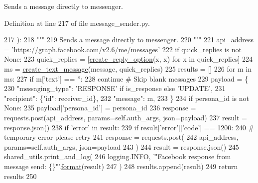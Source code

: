 \begin{DoxyVerb}Sends a message directly to messenger.
\end{DoxyVerb}
 

Definition at line 217 of file message\+\_\+sender.\+py.


\begin{DoxyCode}
217     ):
218         \textcolor{stringliteral}{"""}
219 \textcolor{stringliteral}{        Sends a message directly to messenger.}
220 \textcolor{stringliteral}{        """}
221         api\_address = \textcolor{stringliteral}{'https://graph.facebook.com/v2.6/me/messages'}
222         \textcolor{keywordflow}{if} quick\_replies \textcolor{keywordflow}{is} \textcolor{keywordflow}{not} \textcolor{keywordtype}{None}:
223             quick\_replies = [\hyperlink{namespaceparlai_1_1chat__service_1_1services_1_1messenger_1_1message__sender_a895e006007913ad0fde9c2c9bf9ec5a5}{create\_reply\_option}(x, x) \textcolor{keywordflow}{for} x \textcolor{keywordflow}{in} quick\_replies]
224         ms = \hyperlink{namespaceparlai_1_1chat__service_1_1services_1_1messenger_1_1message__sender_a4c32dfd7947a473a730b81e9356e3513}{create\_text\_message}(message, quick\_replies)
225         results = []
226         \textcolor{keywordflow}{for} m \textcolor{keywordflow}{in} ms:
227             \textcolor{keywordflow}{if} m[\textcolor{stringliteral}{'text'}] == \textcolor{stringliteral}{''}:
228                 \textcolor{keywordflow}{continue}  \textcolor{comment}{# Skip blank messages}
229             payload = \{
230                 \textcolor{stringliteral}{"messaging\_type"}: \textcolor{stringliteral}{'RESPONSE'} \textcolor{keywordflow}{if} is\_response \textcolor{keywordflow}{else} \textcolor{stringliteral}{'UPDATE'},
231                 \textcolor{stringliteral}{"recipient"}: \{\textcolor{stringliteral}{"id"}: receiver\_id\},
232                 \textcolor{stringliteral}{"message"}: m,
233             \}
234             \textcolor{keywordflow}{if} persona\_id \textcolor{keywordflow}{is} \textcolor{keywordflow}{not} \textcolor{keywordtype}{None}:
235                 payload[\textcolor{stringliteral}{'persona\_id'}] = persona\_id
236             response = requests.post(api\_address, params=self.auth\_args, json=payload)
237             result = response.json()
238             \textcolor{keywordflow}{if} \textcolor{stringliteral}{'error'} \textcolor{keywordflow}{in} result:
239                 \textcolor{keywordflow}{if} result[\textcolor{stringliteral}{'error'}][\textcolor{stringliteral}{'code'}] == 1200:
240                     \textcolor{comment}{# temporary error please retry}
241                     response = requests.post(
242                         api\_address, params=self.auth\_args, json=payload
243                     )
244                     result = response.json()
245             shared\_utils.print\_and\_log(
246                 logging.INFO, \textcolor{stringliteral}{'"Facebook response from message send: \{\}"'}.\hyperlink{namespaceparlai_1_1chat__service_1_1services_1_1messenger_1_1shared__utils_a32e2e2022b824fbaf80c747160b52a76}{format}(result)
247             )
248             results.append(result)
249         \textcolor{keywordflow}{return} results
250 
\end{DoxyCode}
